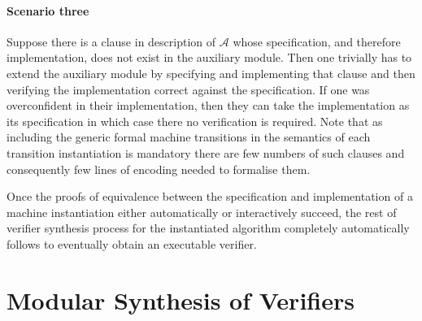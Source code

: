 \documentclass[10pt,conference]{IEEEtran}
\begin{document}
 \paragraph*{Scenario three} 
 Suppose there is a clause in description of $\mathcal{A}$ whose specification, and  therefore implementation,  does not exist in the auxiliary module. Then one trivially has to extend the auxiliary module by specifying and implementing that clause and then verifying the implementation correct against the specification.  If one was overconfident in their implementation, then they can take the implementation as its specification in which case there no verification is required.  Note that as including the generic formal machine transitions in the semantics of each transition instantiation is mandatory  
 there are few  numbers of such clauses and consequently few lines of encoding needed to formalise them. 
 
 Once the proofs of equivalence between the specification and implementation of a machine instantiation either automatically or interactively succeed, the rest of verifier synthesis process for the instantiated algorithm completely automatically follows to eventually obtain an executable verifier. 
\section{Modular Synthesis of Verifiers}\label{sec:Syn}
\end{document}
